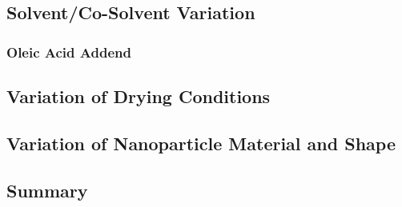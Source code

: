 \documentclass[\main/dresen_thesis.tex]{subfiles}
\renewcommand{\thisPath}{\main/chapters/monolayers/preparationMonolayers}
\begin{document}
    \label{sec:monolayers:preparation}
    \subsection{Solvent/Co-Solvent Variation}
      
      \FloatBarrier
      \subsubsection{Oleic Acid Addend}
        
        \FloatBarrier

    \subsection{Variation of Drying Conditions}
      
      \FloatBarrier

    \subsection{Variation of Nanoparticle Material and Shape}
      
      \FloatBarrier

    \subsection{Summary}
      
      \FloatBarrier
\end{document}
